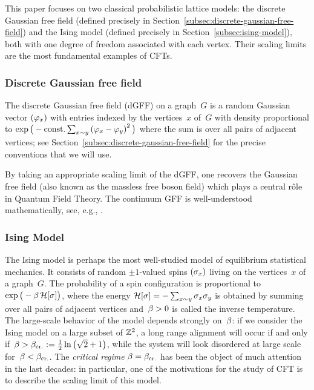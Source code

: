 \documentclass[12pt,oneside,english]{amsart}
\numberwithin{equation}{section}
\numberwithin{figure}{section}
\theoremstyle{plain}
\theoremstyle{plain}
\theoremstyle{plain}
\theoremstyle{plain}
\theoremstyle{remark}
\theoremstyle{definition}
\theoremstyle{plain}
\theoremstyle{plain}
\numberwithin{thm}{section}
\begin{document}
This paper focuses on two classical probabilistic lattice models:
the discrete Gaussian free field
(defined precisely in Section~\ref{subsec:discrete-gaussian-free-field})
and the Ising model
(defined precisely in Section~\ref{subsec:ising-model}),
both with one
degree of freedom associated with each vertex. Their scaling limits
are the most fundamental examples of CFTs.

\subsubsection{\label{subsec:dgff}Discrete Gaussian free field}

The discrete Gaussian free field (dGFF) on a graph~$G$ is a random
Gaussian vector $\left({\varphi}_{x}\right)$ with entries indexed by
the vertices~$x$ of~$G$ with density proportional to 
$\exp \big( -\mathrm{const.} \sum_{x\sim y}
\left({\varphi}_{x}-{\varphi}_{y}\right)^{2} \big)$
where the sum is over all pairs of adjacent vertices;
see Section~\ref{subsec:discrete-gaussian-free-field} for the precise
conventions that we will use.

By taking an appropriate scaling limit of the dGFF, one recovers the
Gaussian free field (also known as the massless free boson field)
which plays a central r\^ole in Quantum Field Theory. The continuum
GFF is well-understood mathematically, see, e.g., 
\cite{gawedzki,glimm-jaffe,kang-makarov,sheffield}.

\subsubsection{\label{subsec:ising}Ising Model }

The Ising model is perhaps the most well-studied model of equilibrium
statistical mechanics. It consists of random $\pm1$-valued spins
$\left({\sigma}_{x}\right)$ living on the vertices~$x$ of a graph~$G$.
The probability of a spin configuration is proportional to 
$\exp \big( -{{\beta}} \, \mathcal{H} [{\sigma}] \big)$,
where the energy
$\mathcal{H} [{\sigma}] =
   - \sum_{x\sim y} {\sigma}_{x} {\sigma}_{y}$
is obtained by summing over all pairs of adjacent vertices and~${{\beta}}>0$
is called the inverse temperature. The large-scale behavior of the
model depends strongly on~${{\beta}}$: if we consider the Ising model
on a large subset of $ \mathbb{Z}^2$, a long range alignment will
occur if and only
if~${{\beta}} > {{\beta}}_{\mathrm{cr.}} := \frac{1}{2}\ln\left(\sqrt{2}+1\right)$,
while the system will look disordered at large scale
for~${{\beta}} < {{\beta}}_{\mathrm{cr.}}$.
The \emph{critical regime} ${{\beta}}={{\beta}}_{\mathrm{cr.}}$ has been the object
of much attention in the last decades: in particular, one of the motivations
for the study of CFT is to describe the scaling limit of this model.
\end{document}
